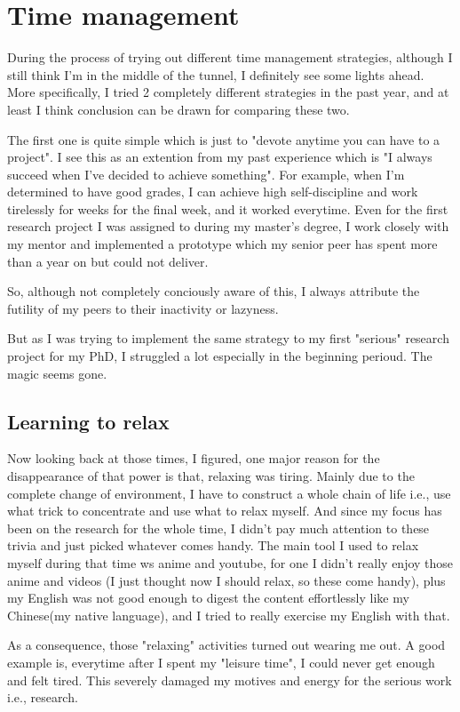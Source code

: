 \section{Time management}
\label{sec:time}
During the process of trying out different time management strategies, although I still think I'm in the middle of the tunnel, I definitely see some lights ahead.
More specifically, I tried 2 completely different strategies in the past year, and at least I think conclusion can be drawn for comparing these two.

The first one is quite simple which is just to "devote anytime you can have to a project".
I see this as an extention from my past experience which is "I always succeed when I've decided to achieve something".
For example, when I'm determined to have good grades, I can achieve high self-discipline and work tirelessly for weeks for the final week, and it worked everytime.
Even for the first research project I was assigned to during my master's degree, I work closely with my mentor and implemented a prototype 
which my senior peer has spent more than a year on but could not deliver.

So, although not completely conciously aware of this, I always attribute the futility of my peers to their inactivity or lazyness.

But as I was trying to implement the same strategy to my first "serious" research project for my PhD, I struggled a lot especially in the beginning perioud.
The magic seems gone.
\subsection{Learning to relax}
Now looking back at those times, I figured, one major reason for the disappearance of that power is that, relaxing was tiring.
Mainly due to the complete change of environment, I have to construct a whole chain of life i.e., use what trick to concentrate and use what to relax myself.
And since my focus has been on the research for the whole time, I didn't pay much attention to these trivia and just picked whatever comes handy.
The main tool I used to relax myself during that time ws anime and youtube, for one I didn't really enjoy those anime and videos
(I just thought now I should relax, so these come handy), plus my English was not good enough to digest the content effortlessly 
like my Chinese(my native language), and I tried to really exercise my English with that.

As a consequence, those "relaxing" activities turned out wearing me out. A good example is, everytime after I spent my "leisure time", I could never get enough and felt tired.
This severely damaged my motives and energy for the serious work i.e., research.

